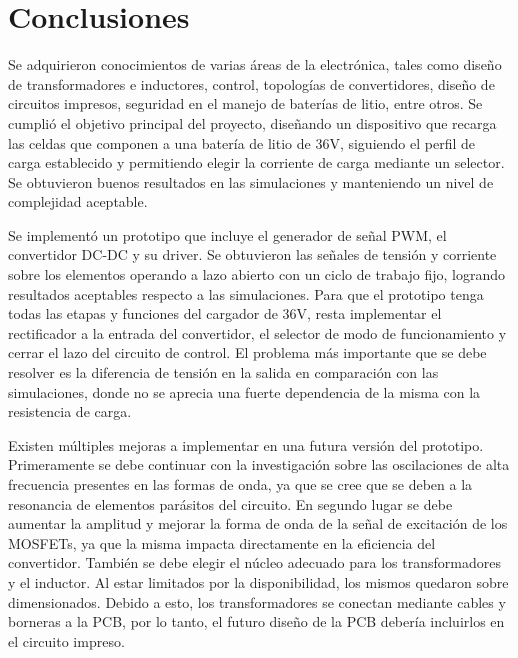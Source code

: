 \section{Conclusiones}

  

Se adquirieron conocimientos de varias áreas de la electrónica, tales como diseño de transformadores e inductores, control, topologías de convertidores, diseño de circuitos impresos, seguridad en el manejo de baterías de litio, entre otros.
Se cumplió el objetivo principal del proyecto, diseñando un dispositivo que recarga las celdas que componen a una batería de litio de 36V, siguiendo el perfil de carga establecido y permitiendo elegir la corriente de carga mediante un selector.
Se obtuvieron buenos resultados en las simulaciones y manteniendo un nivel de complejidad aceptable.

Se implementó un prototipo que incluye el generador de señal PWM, el convertidor DC-DC y su driver.
Se obtuvieron las señales de tensión y corriente sobre los elementos operando a lazo abierto con un ciclo de trabajo fijo, logrando resultados aceptables respecto a las simulaciones.
Para que el prototipo tenga todas las etapas y funciones del cargador de 36V, resta implementar el rectificador a la entrada del convertidor, el selector de modo de funcionamiento y cerrar el lazo del circuito de control.
El problema más importante que se debe resolver es la diferencia de tensión en la salida en comparación con las simulaciones, donde no se aprecia una fuerte dependencia de la misma con la resistencia de carga.

Existen múltiples mejoras a implementar en una futura versión del prototipo.
Primeramente se debe continuar con la investigación sobre las oscilaciones de alta frecuencia presentes en las formas de onda, ya que se cree que se deben a la resonancia de elementos parásitos del circuito.
En segundo lugar se debe aumentar la amplitud y mejorar la forma de onda de la señal de excitación de los MOSFETs, ya que la misma impacta directamente en la eficiencia del convertidor.
También se debe elegir el núcleo adecuado para los transformadores y el inductor. Al estar limitados por la disponibilidad, los mismos quedaron sobre dimensionados. 
Debido a esto, los transformadores se conectan mediante cables y borneras a la PCB, por lo tanto, el futuro diseño de la PCB debería incluirlos en el circuito impreso.